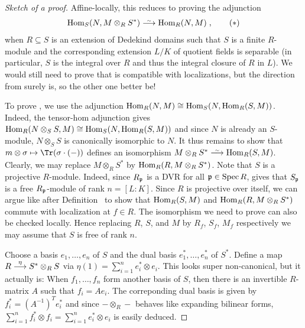 \documentclass[a4paper,parskip=half,numbers=enddot, DIV=12]{scrreprt}
\begin{document}
\begin{proof}[Sketch of a proof]
	Affine-locally, this reduces to proving the adjunction 
	\begin{align}\lbl{eq:localAdjunction}
		\Hom_S(N,M\otimes_RS^*)\isomorphism\Hom_R(N,M)\;,\tag{$*$}
	\end{align}
	when $R\subseteq S$ is an extension of Dedekind domains such that $S$ is a finite $R$-module and the corresponding extension $L/K$ of quotient fields is separable (in particular, $S$ is the integral over $R$ and thus the integral closure of $R$ in $L$). We would still need to prove that  is compatible with localizations, but the direction from  surely is, so the other one better be!
	
	To prove , we use the adjunction $\operatorname{Hom}_R(N,M)\cong \operatorname{Hom}_S(N,\operatorname{Hom}_R(S,M))$. Indeed, the tensor-hom adjunction gives $\operatorname{Hom}_R(N\otimes_SS,M)\cong \operatorname{Hom}_S(N,\operatorname{Hom}_R(S,M))$ and since $N$ is already an $S$-module, $N\otimes_SS$ is canonically isomorphic to $N$. It thus remains to show that $m\otimes \sigma\mapsto \Tr(\sigma\cdot (-))$ defines an isomorphism $M\otimes_RS^*\isomorphism\Hom_R(S,M)$. Clearly, we may replace $M\otimes_RS^*$ by $\operatorname{Hom}_R(R,M\otimes_RS^*)$. Note that $S$ is a projective $R$-module. Indeed, since $R_{\mathfrak{p}}$ is a DVR for all $\mathfrak{p}\in\operatorname{Spec} R$, \cite[Ch.~I, (2.10)]{NEUKIRCH} gives that $S_{\mathfrak{p}}$ is a free $R_{\mathfrak{p}}$-module of rank $n=[L:K]$. Since $R$ is projective over itself, we can argue like after Definition~ to show that $\operatorname{Hom}_R(S,M)$ and $\operatorname{Hom}_R(R,M\otimes_RS^*)$ commute with localization at $f\in R$. The isomorphism we need to prove can also be checked locally. Hence replacing $R$, $S$, and $M$ by $R_f$, $S_f$, $M_f$ respectively we may assume that $S$ is free of rank $n$. 
	
	Choose a basis $e_1,\ldots, e_n$ of $S$ and the dual basis $e_1^*,\ldots,e_n^*$ of $S^*$. Define a map $R\morphism[\eta]S^*\otimes_RS$ via $\eta(1)=\sum_{i=1}^ne_i^*\otimes e_i$. This looks super non-canonical, but it actually is: When $f_1,\ldots,f_n$ form another basis of $S$, then there is an invertible $R$-matrix $A$ such that $f_i=Ae_i$. The correponding dual basis is given by $f_i^*=(A^{-1})^Te_i^*$ and since $-\otimes_R-$ behaves like expanding bilinear forms, $\sum_{i=1}^nf_i^*\otimes f_i=\sum_{i=1}^ne_i^*\otimes e_i$ is easily deduced. 
	

\end{proof}
\end{document}
